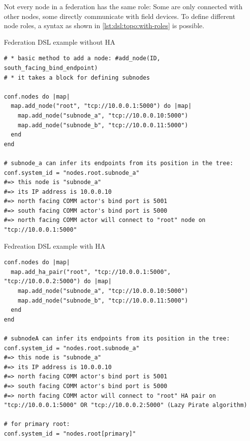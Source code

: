 Not every node in a federation has the same role: Some are only connected with other
nodes, some directly communicate with field devices. To define different node roles, a
syntax as shown in \autoref{lst:dsl:topo:with-roles} is possible.

\begin{listing}
	\caption{Federation DSL example without HA}
	\label{lst:dsl:topo:no-ha}
	\begin{verbatim}
# * basic method to add a node: #add_node(ID, south_facing_bind_endpoint)
# * it takes a block for defining subnodes

conf.nodes do |map|
  map.add_node("root", "tcp://10.0.0.1:5000") do |map|
    map.add_node("subnode_a", "tcp://10.0.0.10:5000")
    map.add_node("subnode_b", "tcp://10.0.0.11:5000")
  end
end

# subnode_a can infer its endpoints from its position in the tree:
conf.system_id = "nodes.root.subnode_a"
#=> this node is "subnode_a"
#=> its IP address is 10.0.0.10
#=> north facing COMM actor's bind port is 5001
#=> south facing COMM actor's bind port is 5000
#=> north facing COMM actor will connect to "root" node on "tcp://10.0.0.1:5000"
	\end{verbatim}
\end{listing}

\begin{listing}
	\caption{Fedreation DSL example with HA}
	\label{lst:dsl:topo:with-ha}
	\begin{verbatim}
conf.nodes do |map|
  map.add_ha_pair("root", "tcp://10.0.0.1:5000", "tcp://10.0.0.2:5000") do |map|
    map.add_node("subnode_a", "tcp://10.0.0.10:5000")
    map.add_node("subnode_b", "tcp://10.0.0.11:5000")
  end
end

# subnodeA can infer its endpoints from its position in the tree:
conf.system_id = "nodes.root.subnode_a"
#=> this node is "subnode_a"
#=> its IP address is 10.0.0.10
#=> north facing COMM actor's bind port is 5001
#=> south facing COMM actor's bind port is 5000
#=> north facing COMM actor will connect to "root" HA pair on "tcp://10.0.0.1:5000" OR "tcp://10.0.0.2:5000" (Lazy Pirate algorithm)

# for primary root:
conf.system_id = "nodes.root[primary]"
	\end{verbatim}
\end{listing}

